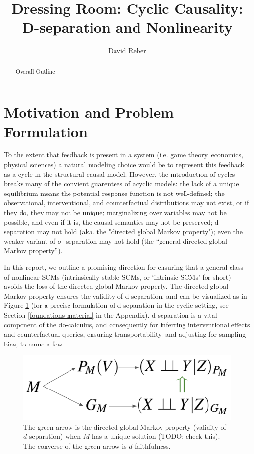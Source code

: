 \documentclass[letterpaper,10pt]{article}
\begin{document}
\title{Dressing Room: Cyclic Causality: D-separation and Nonlinearity}

\author{David Reber}
\address{Columbia University}


\begin{abstract}
Overall Outline
\end{abstract}


\section{Motivation and Problem Formulation}

To the extent that feedback is present in a system (i.e. game theory, economics, physical sciences) a natural modeling choice would be to represent this feedback as a cycle in the structural causal model. However, the introduction of cycles breaks many of the convient guarentees of acyclic models: the lack of a unique equilibrium means the potential response function is not well-defined; the observational, interventional, and counterfactual distributions may not exist, or if they do, they may not be unique; marginalizing over variables may not be possible, and even if it is, the causal semantics may not be preserved; d-separation may not hold (aka. the "directed global Markov property"); even the weaker variant of $\sigma$ -separation may not hold (the “general directed global Markov property”).

In this report, we outline a promising direction for ensuring that a general class of nonlinear SCMs (intrinsically-stable SCMs, or `intrinsic SCMs' for short) avoids the loss of the directed global Markov property.
The directed global Markov property ensures the validity of d-separation, and can be visualized as in Figure \ref{fig:dsep-Markov-flow} (for a precise formulation of d-separation in the cyclic setting, see Section \ref{foundations-material} in the Appendix).
d-separation is a vital component of the do-calculus, and consequently for inferring interventional effects and counterfactual queries, ensuring transportability, and adjusting for sampling bias, to name a few.

\begin{figure}
\centering
\includegraphics[width=.4\linewidth]{pics/my_own/dsep_Markov_flow.png}
\caption{The green arrow is the directed global Markov property (validity of $d$-separation) when $M$ has a unique solution \color{red}(TODO: check this)\color{black}. The converse of the green arrow is $d$-faithfulness.}
\label{fig:dsep-Markov-flow}
\end{figure}
\end{document}
